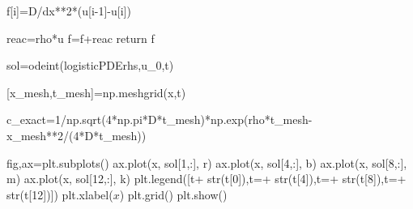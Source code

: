 \documentclass[
  letterpaper,
  DIV=11,
  numbers=noendperiod]{scrreprt}
\newenvironment{Shaded}{\begin{snugshade}}{\end{snugshade}}
\newcommand{\BuiltInTok}[1]{\textcolor[rgb]{0.00,0.23,0.31}{#1}}
\newcommand{\ControlFlowTok}[1]{\textcolor[rgb]{0.00,0.23,0.31}{#1}}
\newcommand{\DecValTok}[1]{\textcolor[rgb]{0.68,0.00,0.00}{#1}}
\newcommand{\NormalTok}[1]{\textcolor[rgb]{0.00,0.23,0.31}{#1}}
\newcommand{\OperatorTok}[1]{\textcolor[rgb]{0.37,0.37,0.37}{#1}}
\newcommand{\StringTok}[1]{\textcolor[rgb]{0.13,0.47,0.30}{#1}}
\theoremstyle{plain}
\theoremstyle{definition}
\theoremstyle{plain}
\theoremstyle{remark}
\begin{document}
\begin{Shaded}
\begin{Highlighting}[]
\NormalTok{    f[i]}\OperatorTok{=}\NormalTok{D}\OperatorTok{/}\NormalTok{dx}\OperatorTok{**}\DecValTok{2}\OperatorTok{*}\NormalTok{(u[i}\OperatorTok{{-}}\DecValTok{1}\NormalTok{]}\OperatorTok{{-}}\NormalTok{u[i])}

\NormalTok{    reac}\OperatorTok{=}\NormalTok{rho}\OperatorTok{*}\NormalTok{u}
\NormalTok{    f}\OperatorTok{=}\NormalTok{f}\OperatorTok{+}\NormalTok{reac}
    \ControlFlowTok{return}\NormalTok{ f  }

\NormalTok{sol}\OperatorTok{=}\NormalTok{odeint(logisticPDErhs,u\_0,t)}


\NormalTok{[x\_mesh,t\_mesh]}\OperatorTok{=}\NormalTok{np.meshgrid(x,t)}

\NormalTok{c\_exact}\OperatorTok{=}\DecValTok{1}\OperatorTok{/}\NormalTok{np.sqrt(}\DecValTok{4}\OperatorTok{*}\NormalTok{np.pi}\OperatorTok{*}\NormalTok{D}\OperatorTok{*}\NormalTok{t\_mesh)}\OperatorTok{*}\NormalTok{np.exp(rho}\OperatorTok{*}\NormalTok{t\_mesh}\OperatorTok{{-}}\NormalTok{x\_mesh}\OperatorTok{**}\DecValTok{2}\OperatorTok{/}\NormalTok{(}\DecValTok{4}\OperatorTok{*}\NormalTok{D}\OperatorTok{*}\NormalTok{t\_mesh))}

\NormalTok{fig,ax}\OperatorTok{=}\NormalTok{plt.subplots()}
\NormalTok{ax.plot(x, sol[}\DecValTok{1}\NormalTok{,:], }\StringTok{\textquotesingle{}r\textquotesingle{}}\NormalTok{)}
\NormalTok{ax.plot(x, sol[}\DecValTok{4}\NormalTok{,:], }\StringTok{\textquotesingle{}b\textquotesingle{}}\NormalTok{)}
\NormalTok{ax.plot(x, sol[}\DecValTok{8}\NormalTok{,:], }\StringTok{\textquotesingle{}m\textquotesingle{}}\NormalTok{)}
\NormalTok{ax.plot(x, sol[}\DecValTok{12}\NormalTok{,:], }\StringTok{\textquotesingle{}k\textquotesingle{}}\NormalTok{)}
\NormalTok{plt.legend([}\StringTok{\textquotesingle{}t\textquotesingle{}}\OperatorTok{+} \BuiltInTok{str}\NormalTok{(t[}\DecValTok{0}\NormalTok{]),}\StringTok{\textquotesingle{}t=\textquotesingle{}}\OperatorTok{+} \BuiltInTok{str}\NormalTok{(t[}\DecValTok{4}\NormalTok{]),}\StringTok{\textquotesingle{}t=\textquotesingle{}}\OperatorTok{+} \BuiltInTok{str}\NormalTok{(t[}\DecValTok{8}\NormalTok{]),}\StringTok{\textquotesingle{}t=\textquotesingle{}}\OperatorTok{+} \BuiltInTok{str}\NormalTok{(t[}\DecValTok{12}\NormalTok{])])}
\NormalTok{plt.xlabel(}\StringTok{\textquotesingle{}$x$\textquotesingle{}}\NormalTok{)}
\NormalTok{plt.grid()}
\NormalTok{plt.show()}


\end{Highlighting}
\end{Shaded}
\end{document}
